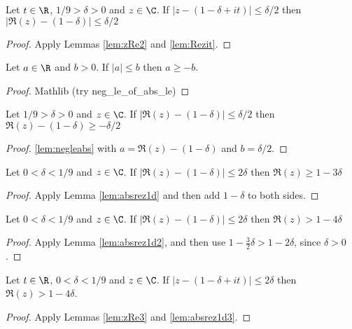 \begin{lemma}\label{lem:zRe3} 
\leanok
Let $t\in\R$, $1/9 > \delta >0$ and $z\in \C$. If $|z-(1-\delta+it)| \le \delta/2$ then $|\Re(z)-(1-\delta)| \le \delta/2$
\end{lemma}
\begin{proof}
\leanok
{}
Apply Lemmas \ref{lem:zRe2} and \ref{lem:Rezit}.
\end{proof}

\begin{lemma}\label{lem:negleabs} 
\leanok
Let $a\in\R$ and $b>0$. If $|a|\le b$ then $a\ge -b$.
\end{lemma}
\begin{proof}
\leanok
Mathlib (try neg\_le\_of\_abs\_le)
\end{proof}


\begin{lemma}\label{lem:absrez1d} 
\leanok
Let $1/ 9 > \delta >0$ and $z\in \C$. If $|\Re(z)-(1-\delta)| \le \delta/2$ then $\Re(z)-(1-\delta) \ge -\delta/2$
\end{lemma}
\begin{proof}
\leanok
{}
\ref{lem:negleabs} with $a=\Re(z)-(1-\delta)$ and $b=\delta/2$.
\end{proof}

\begin{lemma}\label{lem:absrez1d2}  \leanok
Let $0<\delta<1/9$ and $z\in \C$. If $|\Re(z)-(1-\delta)| \le 2\delta$ then $\Re(z) \ge 1-3\delta$
\end{lemma}
\begin{proof}
\leanok
{}
Apply Lemma \ref{lem:absrez1d} and then add $1-\delta$ to both sides.
\end{proof}

\begin{lemma}\label{lem:absrez1d3} 
\leanok
Let $0<\delta<1/9$ and $z\in \C$. If $|\Re(z)-(1-\delta)| \le 2\delta$ then $\Re(z) > 1-4\delta$
\end{lemma}
\begin{proof}
\leanok
{}
Apply Lemma \ref{lem:absrez1d2}, and then use $1-\frac{3}{2}\delta > 1-2\delta$, since $\delta>0$.
\end{proof}

\begin{lemma}\label{lem:zRe4} 
\leanok
Let $t\in\R$, $0<\delta<1/9$ and $z\in \C$. If $|z-(1-\delta+it)| \le 2\delta$ then $\Re(z) > 1-4\delta$.
\end{lemma}
\begin{proof}
\leanok
{}
Apply Lemmas \ref{lem:zRe3} and \ref{lem:absrez1d3}.
\end{proof}


